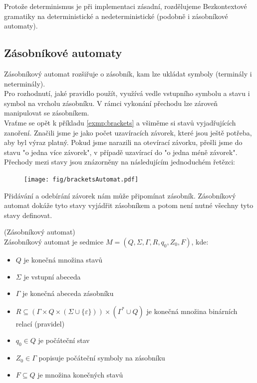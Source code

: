 Protože determinismus je při implementaci zásadní, rozdělujeme Bezkontextové gramatiky
na deterministické a nedeterministické (podobně i zásobníkové automaty).\\


\subsection{Zásobníkové automaty}

Zásobníkový automat rozšiřuje  o zásobník, kam lze
ukládat symboly (terminály i neterminály).\\

Pro rozhodnutí, jaké pravidlo použít,
využívá vedle vstupního symbolu a stavu i symbol na vrcholu zásobníku. V rámci vykonání
přechodu lze zároveň manipulovat se zásobníkem.\\

Vraťme se opět k příkladu \ref{exmp:brackets} a všiměme si stavů
vyjadřujících zanoření. Značili jsme je jako počet uzavíracích závorek,
které jsou ještě potřeba, aby byl výraz platný. Pokud jsme narazili na
otevírací závorku, přešli jsme do stavu "o jedna více závorek", v případě uzavírací
do "o jedna méně závorek". Přechody mezi stavy jsou znázorněny na
následujícím jednoduchém řetězci:

\begin{figure}[H]
  \centering
  \texttt{[image: fig/bracketsAutomat.pdf]}
\end{figure}

Přidávání a odebírání závorek nám může připomínat zásobník.
Zásobníkový automat dokáže tyto stavy vyjádřit zásobníkem a potom
není nutné všechny tyto stavy definovat.\\

\begin{defn}
  (Zásobníkový automat) \cite[str. 18]{Koutny}\\
  Zásobníkový automat je sedmice $M = (Q, \Sigma, \Gamma, R, q_0, Z_0, F)$, kde:
  \begin{itemize}
    \item $Q$ je konečná množina stavů
    \item $\Sigma$ je vstupní abeceda
    \item $\Gamma$ je konečná abeceda zásobníku
    \item $R \subseteq (\Gamma \times Q \times (\Sigma \cup \{\varepsilon\} ))
    \times (\Gamma^* \cup Q)$ je konečná množina binárních relací (pravidel)
    \item $q_0 \in Q$ je počáteční stav
    \item $Z_0 \in \Gamma$ popisuje počáteční symboly na zásobníku
    \item $F \subseteq Q$ je množina konečných stavů
  \end{itemize}
\end{defn}


